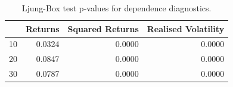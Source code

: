 \begin{table}[htbp]
\centering
\begin{tabular}{lrrr}
\toprule
 & Returns & Squared Returns & Realised Volatility \\
\midrule
10 & 0.0324 & 0.0000 & 0.0000 \\
20 & 0.0847 & 0.0000 & 0.0000 \\
30 & 0.0787 & 0.0000 & 0.0000 \\
\bottomrule
\end{tabular}
\caption{Ljung-Box test p-values for dependence diagnostics.}
\label{tab:ljung_box}
\end{table}
